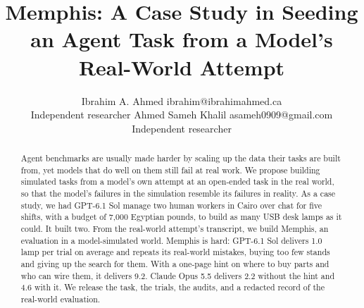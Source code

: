 \documentclass[10pt]{article}
\title{Memphis: A Case Study in Seeding an Agent Task from a Model's Real-World Attempt}
\author{}
\author{\name Ibrahim A. Ahmed \email ibrahim@ibrahimahmed.ca \\
      \addr Independent researcher
      \AND
      \name Ahmed Sameh Khalil \email asameh0909@gmail.com \\
      \addr Independent researcher}
\begin{document}
\maketitle

\begin{abstract}
Agent benchmarks are usually made harder by scaling up the data their tasks are built from, yet models that do well on them still fail at real work. We propose building simulated tasks from a model's own attempt at an open-ended task in the real world, so that the model's failures in the simulation resemble its failures in reality. As a case study, we had GPT-6.1 Sol manage two human workers in Cairo over chat for five shifts, with a budget of 7,000 Egyptian pounds, to build as many USB desk lamps as it could. It built two. From the real-world attempt's transcript, we build Memphis, an evaluation in a model-simulated world. Memphis is hard: GPT-6.1 Sol delivers 1.0 lamp per trial on average and repeats its real-world mistakes, buying too few stands and giving up the search for them. With a one-page hint on where to buy parts and who can wire them, it delivers 9.2. Claude Opus 5.5 delivers 2.2 without the hint and 4.6 with it. We release the task, the trials, the audits, and a redacted record of the real-world evaluation.
\end{abstract}
\vspace{0.8em}
\end{document}

